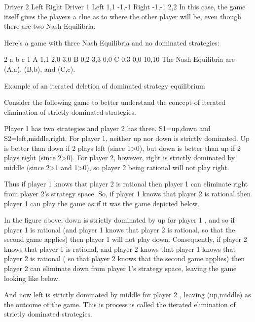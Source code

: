 Driver 2
Left	Right
Driver 1	Left	1,1	-1,-1
Right	-1,-1	2,2
In this case, the game itself gives the players a clue as to where the other player will be, even though there are two Nash Equilibria.

Here's a game with three Nash Equilibria and no dominated strategies:

2
a	b	c
1	A	1,1	2,0	3,0
B	0,2	3,3	0,0
C	0,3	0,0	10,10
The Nash Equilibria are (A,a), (B,b), and (C,c).


Example of an iterated deletion of dominated strategy equilibrium

Consider the following game to better understand the concept of iterated elimination of strictly dominated strategies.


Player 1 has two strategies and player 2 has three. S1={up,down} and S2={left,middle,right}. For player 1, neither up nor down is strictly dominated. Up is better than down if 2 plays left (since 1>0), but down is better than up if 2 plays right (since 2>0). For player 2, however, right is strictly dominated by middle (since 2>1 and 1>0), so player 2 being rational will not play right.

Thus if player 1 knows that player 2 is rational then player 1 can eliminate right from player 2's strategy space. So, if player 1 knows that player 2 is rational then player 1 can play the game as if it was the game depicted below.


In the figure above, down is strictly dominated by up for player 1 , and so if player 1 is rational (and player 1 knows that player 2 is rational, so that the second game applies) then player 1 will not play down. Consequently, if player 2 knows that player 1 is rational, and player 2 knows that player 1 knows that player 2 is rational ( so that player 2 knows that the second game applies) then player 2 can eliminate down from player 1's strategy space, leaving the game looking like below.


And now left is strictly dominated by middle for player 2 , leaving (up,middle) as the outcome of the game. This is process is called the iterated elimination of strictly dominated strategies.
